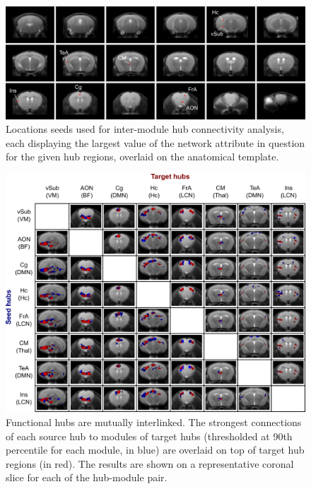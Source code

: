 \begin{figure}[th]
    \centering
    \includegraphics[scale=0.8]{figures/hubs_figure_s1_seed_locations_NEW.png}
    \decoRule
    \caption[Locations seeds used for inter-module hub connectivity
    analysis.]{Locations seeds used for inter-module hub connectivity analysis,
    each displaying the largest value of the network attribute in question for
    the given hub regions, overlaid on the anatomical template. }
    \label{fig:hubs_figs1_seed_location}
\end{figure}

\begin{figure}[th]
    \centering
    \includegraphics[scale=0.7]{figures/hubs_figure_05_voxel_overlap_NEW.png}
    \decoRule
    \caption[Functional hubs are mutually interlinked.]{Functional hubs are
    mutually interlinked. The strongest connections of each source hub to
    modules of target hubs (thresholded at 90th percentile for each module, in
    blue) are overlaid on top of target hub regions (in red). The results are
    shown on a representative coronal slice for each of the hub-module pair.}
    \label{fig:hubs_fig5_hub_connectivity}
\end{figure}

